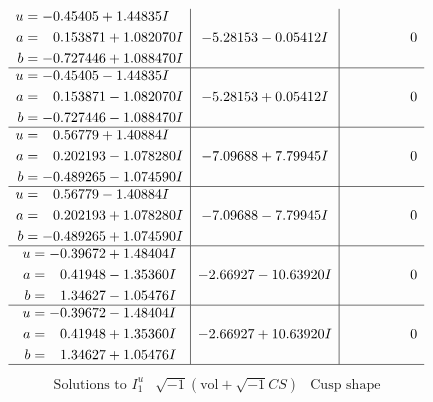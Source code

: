 \documentclass[1p]{elsarticle_modified}
\theoremstyle{definition}
\newcommand{\I}{\sqrt{-1}}
\begin{document}
$$\begin{array}{c|c|c}
\begin{aligned}
u &= -0.45405 + 1.44835 I \\
a &= \phantom{-}0.153871 + 1.082070 I \\
b &= -0.727446 + 1.088470 I\end{aligned}
 & -5.28153 - 0.05412 I & \phantom{-0.000000 } 0 \\ \hline\begin{aligned}
u &= -0.45405 - 1.44835 I \\
a &= \phantom{-}0.153871 - 1.082070 I \\
b &= -0.727446 - 1.088470 I\end{aligned}
 & -5.28153 + 0.05412 I & \phantom{-0.000000 } 0 \\ \hline\begin{aligned}
u &= \phantom{-}0.56779 + 1.40884 I \\
a &= \phantom{-}0.202193 - 1.078280 I \\
b &= -0.489265 - 1.074590 I\end{aligned}
 & -7.09688 + 7.79945 I & \phantom{-0.000000 } 0 \\ \hline\begin{aligned}
u &= \phantom{-}0.56779 - 1.40884 I \\
a &= \phantom{-}0.202193 + 1.078280 I \\
b &= -0.489265 + 1.074590 I\end{aligned}
 & -7.09688 - 7.79945 I & \phantom{-0.000000 } 0 \\ \hline\begin{aligned}
u &= -0.39672 + 1.48404 I \\
a &= \phantom{-}0.41948 - 1.35360 I \\
b &= \phantom{-}1.34627 - 1.05476 I\end{aligned}
 & -2.66927 - 10.63920 I & \phantom{-0.000000 } 0 \\ \hline\begin{aligned}
u &= -0.39672 - 1.48404 I \\
a &= \phantom{-}0.41948 + 1.35360 I \\
b &= \phantom{-}1.34627 + 1.05476 I\end{aligned}
 & -2.66927 + 10.63920 I & \phantom{-0.000000 } 0\\
 \hline 
 \end{array}$$\newpage$$\begin{array}{c|c|c}  
\text{Solutions to }I^u_{1}& \I (\text{vol} + \sqrt{-1}CS) & \text{Cusp shape}\\
 \hline 
\begin{aligned}

\end{aligned}
\end{array}$$
\end{document}
